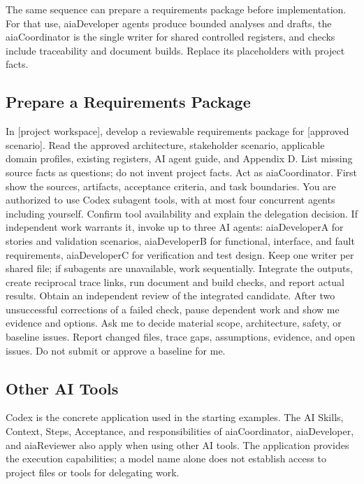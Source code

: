 The same sequence can prepare a requirements package before implementation.
For that use, aiaDeveloper agents produce bounded analyses and drafts, the aiaCoordinator
is the single writer for shared controlled registers, and checks include
traceability and document builds. Replace its placeholders with project facts.

\begin{samepage}
\subsection{Prepare a Requirements Package}

\begingroup\ttfamily\raggedright
\noindent In [project workspace], develop a reviewable requirements package for [approved scenario]. Read the approved architecture, stakeholder scenario, applicable domain profiles, existing registers, AI agent guide, and Appendix D. List missing source facts as questions; do not invent project facts. Act as aiaCoordinator. First show the sources, artifacts, acceptance criteria, and task boundaries. You are authorized to use Codex subagent tools, with at most four concurrent agents including yourself. Confirm tool availability and explain the delegation decision. If independent work warrants it, invoke up to three AI agents: aiaDeveloperA for stories and validation scenarios, aiaDeveloperB for functional, interface, and fault requirements, aiaDeveloperC for verification and test design. Keep one writer per shared file; if subagents are unavailable, work sequentially. Integrate the outputs, create reciprocal trace links, run document and build checks, and report actual results. Obtain an independent review of the integrated candidate. After two unsuccessful corrections of a failed check, pause dependent work and show me evidence and options. Ask me to decide material scope, architecture, safety, or baseline issues. Report changed files, trace gaps, assumptions, evidence, and open issues. Do not submit or approve a baseline for me.\par
\endgroup

\end{samepage}

\subsection{Other AI Tools}
\label{Section:AIOtherTools}
Codex is the concrete application used in the starting examples. The AI Skills,
Context, Steps, Acceptance, and responsibilities of aiaCoordinator,
aiaDeveloper, and aiaReviewer also apply when using other AI tools. The
application provides the execution capabilities; a model name alone does not
establish access to project files or tools for delegating work.

